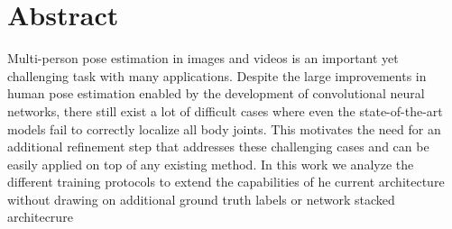 \chapter*{Abstract}

Multi-person pose estimation in images and videos is an important yet challenging task with many applications.
Despite the large improvements in human pose estimation
enabled by the development of convolutional neural networks, there still exist a lot of difficult cases where even the state-of-the-art models fail to correctly localize all body joints. This motivates the need for an additional refinement step that addresses these challenging cases and can be easily applied on top of any existing method. In this work we analyze the different training protocols to extend the capabilities of he current architecture without drawing on additional ground truth labels or network stacked architecrure